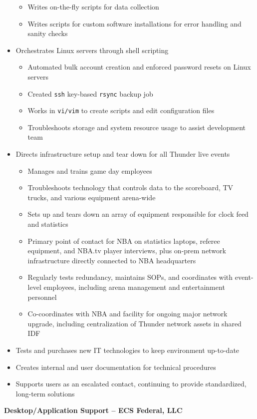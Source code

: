 \documentclass[centered]{res}
\begin{document}
\begin{resume}
\begin{itemize}
\begin{itemize}
	\item Writes on-the-fly scripts for data collection
	\item Writes scripts for custom software installations for error handling and sanity checks
	\end{itemize}
\item Orchestrates Linux servers through shell scripting
	\begin{itemize}
		\item Automated bulk account creation and enforced password resets on Linux servers
		\item Created \texttt{ssh} key-based \texttt{rsync} backup job
		\item Works in \texttt{vi/vim} to create scripts and edit configuration files
		\item Troubleshoots storage and system resource usage to assist development team
	\end{itemize}
\item Directs infrastructure setup and tear down for all Thunder live events
	\begin{itemize}
	\item Manages and trains game day employees
	\item Troubleshoots technology that controls data to the scoreboard, TV trucks, and various equipment arena-wide
	\item Sets up and tears down an array of equipment responsible for clock feed and statistics
	\item Primary point of contact for NBA on statistics laptops, referee equipment, and NBA.tv player interviews, plus on-prem network infrastructure directly connected to NBA headquarters 
	\item Regularly tests redundancy, maintains SOPs, and coordinates with event-level employees, including arena management and entertainment personnel
	\item Co-coordinates with NBA and facility for ongoing major network upgrade, including centralization of Thunder network assets in shared IDF 
	\end{itemize}
\item Tests and purchases new IT technologies to keep environment up-to-date
\item Creates internal and user documentation for technical procedures 
\item Supports users as an escalated contact, continuing to provide standardized, long-term solutions
\end{itemize}
\textbf{Desktop/Application Support -- ECS Federal, LLC}

\end{resume}
\end{document}
